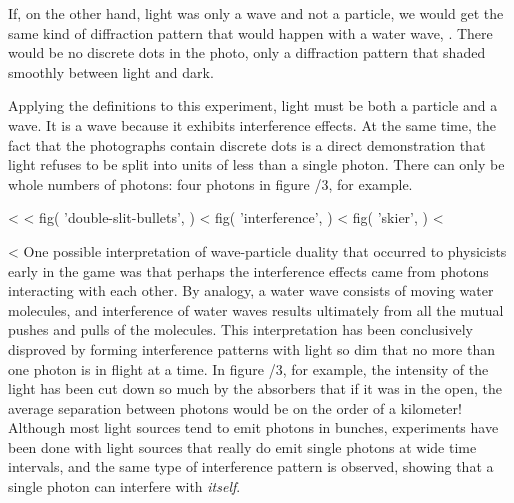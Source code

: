 If, on the other hand, light was only a wave and not a
particle, we would get the same kind of diffraction pattern
that would happen with a water wave, . There would be no
discrete dots in the photo, only a  diffraction pattern that
shaded smoothly between light and dark.

Applying the definitions to this experiment, light must be
both a particle and a wave. It is a wave because it exhibits
interference effects. At the same time, the fact that the
photographs contain discrete dots is a direct demonstration
that light refuses to be split into units of less than a
single photon. There can only be whole numbers of photons:
four photons in figure /3, for example.

<%
<%
  fig(
    'double-slit-bullets',
  )
\spacebetweenfigs
<%
  fig(
    'interference',
  )
\spacebetweenfigs
<%
  fig(
    'skier',
  )
<%

<%
One possible interpretation of wave-particle duality that
occurred to physicists early in the game was that perhaps
the interference effects came from photons interacting with
each other. By analogy, a water wave consists of moving
water molecules, and interference of water waves results
ultimately from all the mutual pushes and pulls of the
molecules. This interpretation has been conclusively disproved by
forming interference patterns with light so dim that no more than one photon
is in flight at a time. In figure /3, for example, the
intensity of the light has been cut down so much by the
absorbers that if it was in the open, the average separation
between photons would be on the order of a kilometer! Although
most light sources tend to emit photons in bunches, experiments
have been done with light sources that really do emit single
photons at wide time intervals, and the same type of interference
pattern is observed, showing that a single photon can interfere with
\emph{itself}.


